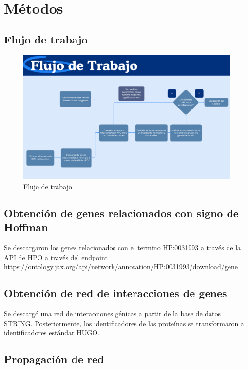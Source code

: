 \section{Métodos}

\subsection{Flujo de trabajo}

\begin{figure}[h!]
	\includegraphics[width=.95\textwidth]{figures/workflow.png}
	\caption{Flujo de trabajo}
	\label{fig:workflow}
\end{figure}

\subsection{Obtención de genes relacionados con signo de Hoffman}

Se descargaron los genes relacionados con el termino HP:0031993 a través de la API de HPO a través del endpoint \url{https://ontology.jax.org/api/network/annotation/HP:0031993/download/gene} 
\subsection{Obtención de red de interacciones de genes}

Se descargó una red de interacciones génicas a partir de la base de datos STRING. Posteriormente, los identificadores de las proteínas se transformaron a identificadores estándar HUGO.

\subsection{Propagación de red}

